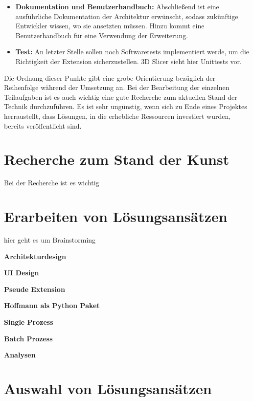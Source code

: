 \begin{itemize}
	\item \textbf{Dokumentation und Benutzerhandbuch:} Abschließend ist eine
		ausführliche Dokumentation der Architektur erwünscht, sodass zukünftige Entwickler
		wissen, wo sie ansetzten müssen. Hinzu kommt eine Benutzerhandbuch für eine Verwendung
		der Erweiterung.

	\item \textbf{Test:} An letzter Stelle sollen noch Softwaretests implementiert
		werde, um die Richtigkeit der Extension sicherzustellen. 3D Slicer sieht
		hier Unittests vor.
\end{itemize}

Die Ordnung dieser Punkte gibt eine grobe Orientierung bezüglich der Reihenfolge
während der Umsetzung an. Bei der Bearbeitung der einzelnen Teilaufgaben ist es
auch wichtig eine gute Recherche zum aktuellen Stand der Technik durchzuführen. Es
ist sehr ungünstig, wenn sich zu Ende eines Projektes herraustellt, dass Lösungen,
in die erhebliche Ressourcen investiert wurden, bereits veröffentlicht sind.

\section{Recherche zum Stand der Kunst}
\label{sec:recherche} Bei der Recherche ist es wichtig

\section{Erarbeiten von Lösungsansätzen}
\label{sec:lösungsansätze} hier geht es um Brainstorming

\textbf{Architekturdesign}

\textbf{UI Design}

\textbf{Pseude Extension}

\textbf{Hoffmann als Python Paket}

\textbf{Single Prozess}

\textbf{Batch Prozess}

\textbf{Analysen}

\section{Auswahl von Lösungsansätzen}